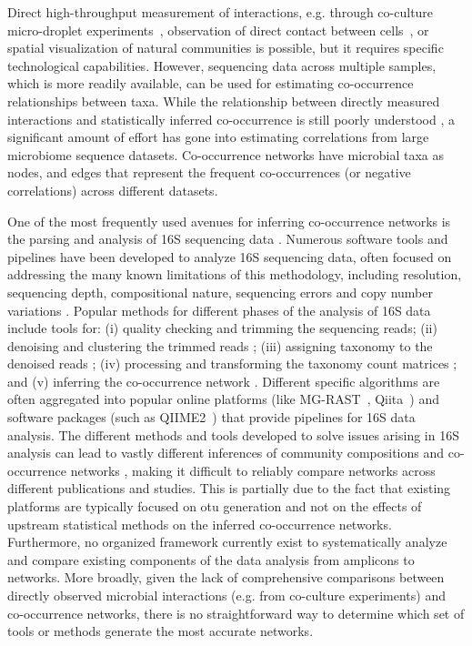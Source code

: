  Direct high-throughput measurement of interactions, e.g. through co-culture micro-droplet experiments~\cite{Hsu2019,Jian2020}, observation of direct contact between cells~\cite{konovalovaCloseEncountersContactdependent2011}, or spatial visualization of natural communities \cite{shiHighlyMultiplexedSpatial2020,hartmannQuantitativeImageAnalysis2021,Wilbert2020} is possible, but it requires specific technological capabilities.
 However, sequencing data across multiple samples, which is more readily available, can be used for estimating co-occurrence relationships between taxa.
 While the relationship between directly measured interactions and statistically inferred co-occurrence is still poorly understood \cite{Zuniga2017}, a significant amount of effort has gone into estimating correlations from large microbiome sequence datasets.
 Co-occurrence networks have microbial taxa as nodes, and edges that represent the frequent co-occurrences (or negative correlations) across different datasets.

One of the most frequently used avenues for inferring co-occurrence networks is the parsing and analysis of 16S sequencing data \cite{Rottjers2018,Friedman2012}.
Numerous software tools and pipelines have been developed to analyze 16S sequencing data, often focused on addressing the many known limitations of this methodology, including resolution, sequencing depth, compositional nature, sequencing errors and copy number variations \cite{Bharti2019,Pollock2018}.
Popular methods for different phases of the analysis of 16S data include tools for: (i) quality checking and trimming the sequencing reads; (ii) denoising and clustering the trimmed reads \cite{Caporaso2010,Callahan2016}; (iii) assigning taxonomy to the denoised reads \cite{DeSantis2006,Quast2012}; (iv) processing and transforming the taxonomy count matrices \cite{Weiss2015}; and (v) inferring the co-occurrence network \cite{Cougoul2019,Kurtz2015}.
Different specific algorithms are often aggregated into popular online platforms (like MG-RAST~\cite{Keegan2016}, Qiita~\cite{qiita}) and software packages (such as QIIME2~\cite{bolyenReproducibleInteractiveScalable2019}) that provide pipelines for 16S data analysis.
The different methods and tools developed to solve issues arising in 16S analysis can lead to vastly different inferences of community compositions and co-occurrence networks \cite{Golob2017,Weiss2016}, making it difficult to reliably compare networks across different publications and studies.
 This is partially due to the fact that existing platforms are typically focused on \ac{otu} generation and not on the effects of upstream statistical methods on the inferred co-occurrence networks.
 Furthermore, no organized framework currently exist to systematically analyze and compare existing components of the data analysis from amplicons to networks.
  More broadly, given the lack of comprehensive comparisons between directly observed microbial interactions (e.g. from co-culture experiments) and co-occurrence networks, there is no straightforward way to determine which set of tools or methods generate the most accurate networks.

